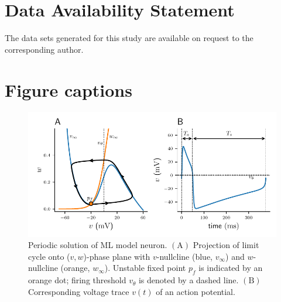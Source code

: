 \documentclass[utf8]{frontiersFPHY} %
\begin{document}
\section*{Data Availability Statement}
The data sets generated for this study are available on request to the corresponding author.




\section*{Figure captions}

\begin{figure}[h!]
  \centering
  \includegraphics{nullclines}
  \caption{Periodic solution of ML model neuron.
    $\bm{\mathrm{(A)}}$
    Projection of limit cycle onto ($v,w$)-phase plane with $v$-nullcline (blue,
    $v_\infty$) and $w$-nullcline (orange, $w_\infty$). Unstable fixed point $p_{f}$
    is indicated by an orange dot; firing threshold $v_{\theta}$ is denoted by a dashed line.
    $\bm{\mathrm{(B)}}$ Corresponding voltage trace $v(t)$ of an action potential.~\label{fig:nullclines}}
\end{figure}
\end{document}
